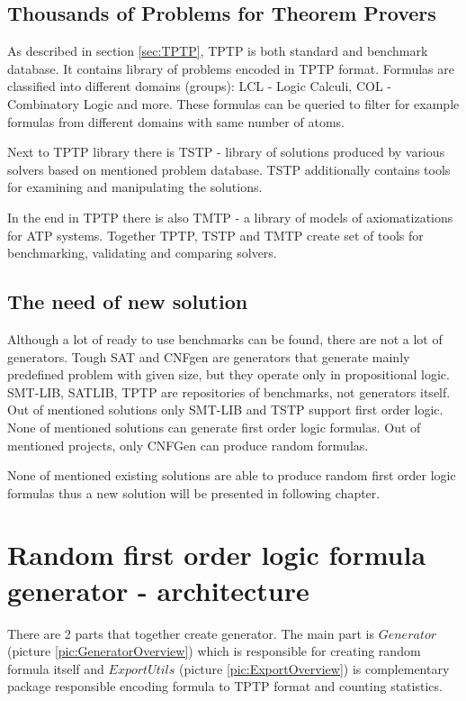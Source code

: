 \section{Thousands of Problems for Theorem Provers}

As described in section \ref{sec:TPTP}, TPTP is both standard and benchmark database. It contains library of problems encoded in TPTP format. Formulas are classified into different domains (groups): LCL - Logic Calculi, COL - Combinatory Logic and more. These formulas can be queried to filter for example formulas from different domains with same number of atoms. 

Next to TPTP library there is \gls{TSTP} - library of solutions produced by various solvers based on mentioned problem database. \gls{TSTP} additionally contains tools for examining and manipulating the solutions. 

In the end in TPTP there is also \gls{TMTP} - a library of models of axiomatizations for \gls{ATP} systems. Together TPTP, TSTP and TMTP create set of tools for benchmarking, validating and comparing solvers.

\section{The need of new solution}

Although a lot of ready to use benchmarks can be found, there are not a lot of generators. Tough SAT and CNFgen are generators that generate mainly predefined problem with given size, but they operate only in propositional logic. SMT-LIB, SATLIB, TPTP are repositories of benchmarks, not generators itself. Out of mentioned solutions only SMT-LIB and TSTP support first order logic. None of mentioned solutions can generate first order logic formulas. Out of mentioned projects, only CNFGen can produce random formulas.

None of mentioned existing solutions are able to produce random first order logic formulas thus a new solution will be presented in following chapter.



\chapter{Random first order logic formula generator - architecture}
\label{chap:GeneratorArchitecture}

There are 2 parts that together create generator. The main part is $Generator$ (picture \ref{pic:GeneratorOverview}) which is responsible for creating random formula itself and $ExportUtils$ (picture \ref{pic:ExportOverview}) is complementary package responsible encoding formula to \gls{TPTP} format and counting statistics.

